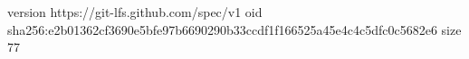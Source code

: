version https://git-lfs.github.com/spec/v1
oid sha256:e2b01362cf3690e5bfe97b6690290b33ccdf1f166525a45e4c4c5dfc0c5682e6
size 77
